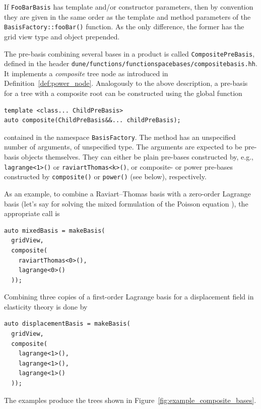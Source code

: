 \documentclass[a4paper,10pt,headings=normal,bibliography=totoc]{scrartcl}
\newcommand{\cpp}[1]{\lstinline[basicstyle=\ttfamily]!#1!}
\newcommand{\file}[1]{\texttt{#1}}
\begin{document}
If \cpp{FooBarBasis} has template and/or constructor parameters, then by convention they
are given in the same order as the template and method
parameters of the \cpp{BasisFactory::fooBar()} function.
As the only difference, the former has the grid view type and object prepended.

The pre-basis combining several bases in a product is called \cpp{CompositePreBasis},
defined in the header \file{dune/functions/functionspacebases/compositebasis.hh}.
It implements a \emph{composite} tree node as introduced in Definition~\ref{def:power_node}.
Analogously to the above description, a pre-basis for a tree with a composite root
can be constructed using the global function
\begin{lstlisting}[style=Interface]
template <class... ChildPreBasis>
auto composite(ChildPreBasis&&... childPreBasis);
\end{lstlisting}
contained in the namespace \cpp{BasisFactory}.
The method has an unspecified number of arguments, of unspecified type.
The arguments are expected to be pre-basis objects themselves.
They can either be plain pre-bases constructed by, e.g.,
\cpp{lagrange<1>()} or \cpp{raviartThomas<k>()},
or composite- or power pre-bases constructed by \cpp{composite()}
or \cpp{power()} (see below), respectively.

As an example, to combine a Raviart--Thomas basis with a zero-order Lagrange basis
(let's say for solving
the mixed formulation of the Poisson equation \cite{braess:2013}), the appropriate call is
\begin{lstlisting}[style=Example]
auto mixedBasis = makeBasis(
  gridView,
  composite(
    raviartThomas<0>(),
    lagrange<0>()
  ));
\end{lstlisting}
Combining three copies of a first-order Lagrange basis for a displacement field in elasticity theory is
done by
\begin{lstlisting}[style=Example]
auto displacementBasis = makeBasis(
  gridView,
  composite(
    lagrange<1>(),
    lagrange<1>(),
    lagrange<1>()
  ));
\end{lstlisting}
The examples produce the trees shown in Figure~\ref{fig:example_composite_bases}.
\end{document}
